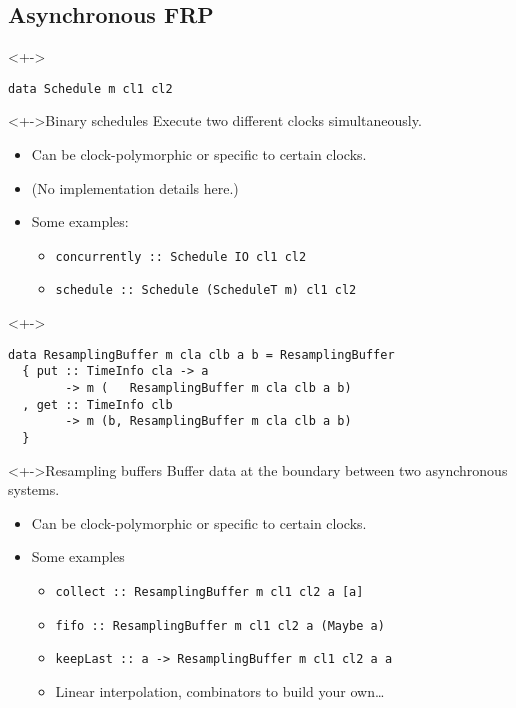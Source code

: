 \documentclass{enigtex-beamer-base}
\begin{document}
\subsection{Asynchronous FRP}

\begin{frame}[fragile]
\begin{block}<+->{}
\begin{verbatim}
data Schedule m cl1 cl2
\end{verbatim}
\end{block}
	\begin{block}<+->{Binary schedules}
		Execute two different clocks simultaneously.
	\end{block}
	\begin{itemize}[<+->]
		\item Can be clock-polymorphic or specific to certain clocks.
		\item (No implementation details here.)
		\item Some examples:
		\begin{itemize}[<+->]
			\item \texttt{concurrently :: Schedule IO cl1 cl2}
			\item \texttt{schedule :: Schedule (ScheduleT m) cl1 cl2}
		\end{itemize}
	\end{itemize}
\end{frame}


\begin{frame}[fragile]
\begin{block}<+->{}
\begin{verbatim}
data ResamplingBuffer m cla clb a b = ResamplingBuffer
  { put :: TimeInfo cla -> a
        -> m (   ResamplingBuffer m cla clb a b)
  , get :: TimeInfo clb
        -> m (b, ResamplingBuffer m cla clb a b)
  }
\end{verbatim}
\end{block}
\begin{block}<+->{Resampling buffers}
Buffer data at the boundary between two asynchronous systems.
\end{block}
	\begin{itemize}[<+->]
		\item Can be clock-polymorphic or specific to certain clocks.
		\item Some examples
		\begin{itemize}[<+->]
			\item \texttt{collect :: ResamplingBuffer m cl1 cl2 a [a]}
			\item \texttt{fifo :: ResamplingBuffer m cl1 cl2 a (Maybe a)}
			\item \texttt{keepLast :: a -> ResamplingBuffer m cl1 cl2 a a}
			\item Linear interpolation, combinators to build your own\dots
		\end{itemize}
	\end{itemize}
\end{frame}
\end{document}
